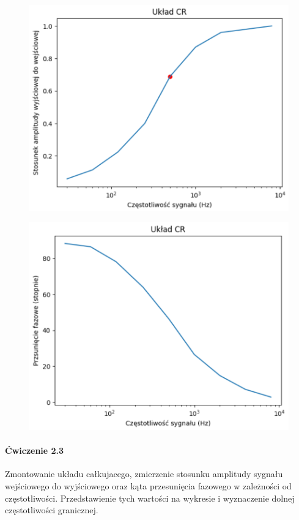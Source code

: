 \documentclass[14pt, table]{extarticle}
\begin{document}
\begin{figure}[H]
\includegraphics[scale=0.7]{D0}
\centering
\captionsetup{labelformat=empty}
\caption{}
\end{figure}

\begin{figure}[H]
\includegraphics[scale=0.7]{D1}
\centering
\captionsetup{labelformat=empty}
\caption{}
\end{figure}

\newpage
\paragraph{Ćwiczenie 2.3\\}
Zmontowanie układu całkujacego, zmierzenie stosunku amplitudy sygnału wejściowego do wyjściowego oraz kąta przesunięcia fazowego w zależności od częstotliwości. Przedstawienie tych wartości na wykresie i wyznaczenie dolnej częstotliwości granicznej.
\end{document}
